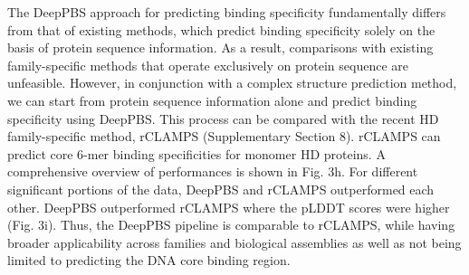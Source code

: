 The DeepPBS approach for predicting binding specificity fundamentally differs from that of existing methods, which predict binding specificity solely on the basis of protein sequence information. As a result, comparisons with existing family-specific methods that operate exclusively on protein sequence are unfeasible. However, in conjunction with a complex structure prediction method, we can start from protein sequence information alone and predict binding specificity using DeepPBS. This process can be compared with the recent HD family-specific method, rCLAMPS \citep{Wetzel2022} (Supplementary Section 8). rCLAMPS can predict core 6-mer binding specificities for monomer HD proteins. A comprehensive overview of performances is shown in Fig. 3h. For different significant portions of the data, DeepPBS and rCLAMPS outperformed each other. DeepPBS outperformed rCLAMPS where the pLDDT scores were higher (Fig. 3i). Thus, the DeepPBS pipeline is comparable to rCLAMPS, while having broader applicability across families and biological assemblies as well as not being limited to predicting the DNA core binding region.

